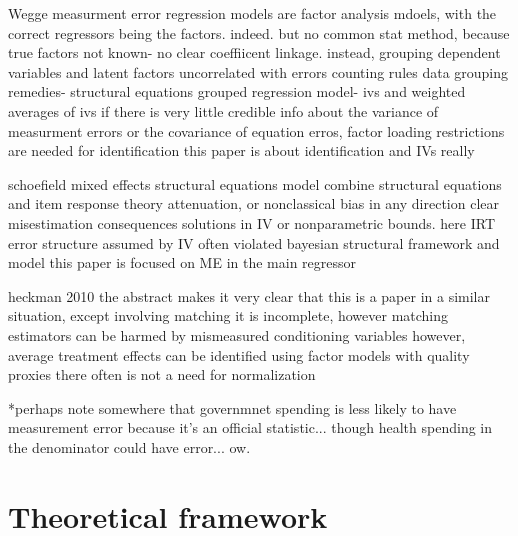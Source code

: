 \documentclass[12pt]{article}
\begin{document}
        Wegge
        measurment error regression models are factor analysis mdoels, with the correct regressors being the factors. indeed. but no common stat method, because true factors not known- no clear coeffiicent linkage. instead, grouping
        dependent variables and latent factors uncorrelated with errors
        counting rules
        data grouping remedies- structural equations
        grouped regression model- ivs and weighted averages of ivs
        if there is very little credible info about the variance of measurment errors or the covariance of equation erros, factor loading restrictions are needed for identification
        this paper is about identification and IVs really

        schoefield
        mixed effects structural equations model
        combine structural equations and item response theory
        attenuation, or nonclassical bias in any direction
        clear misestimation consequences
        solutions in IV or nonparametric bounds. here IRT
        error structure assumed by IV often violated
        bayesian structural framework and model
        this paper is focused on ME in the main regressor

        heckman 2010
        the abstract makes it very clear that this is a paper in a similar situation, except involving matching
        it is incomplete, however
        matching estimators can be harmed by mismeasured conditioning variables
        however, average treatment effects can be identified using factor models with quality proxies
        there often is not a need for normalization

        *perhaps note somewhere that governmnet spending is less likely to have measurement error because it's an official statistic... though health spending in the denominator could have error... ow.

    \section*{Theoretical framework}
\end{document}
